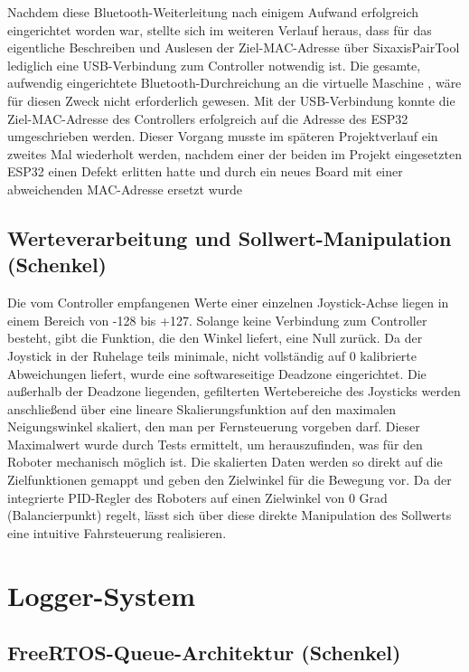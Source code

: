 \documentclass[fontsize=12pt,
parskip=half,	%
department=FakM,  %
logostyle=flat,
twoside, %
DIV=15,BCOR=10mm, %
]{OTHRreprt}
\begin{document}
Nachdem diese Bluetooth-Weiterleitung nach einigem Aufwand erfolgreich eingerichtet worden war, stellte sich im weiteren Verlauf heraus, dass für das eigentliche Beschreiben und Auslesen der Ziel-MAC-Adresse über SixaxisPairTool lediglich eine USB-Verbindung zum Controller notwendig ist.
 Die gesamte, aufwendig eingerichtete Bluetooth-Durchreichung an die virtuelle Maschine , wäre für diesen Zweck nicht erforderlich gewesen. 
 Mit der USB-Verbindung konnte die Ziel-MAC-Adresse des Controllers erfolgreich auf die Adresse des ESP32 umgeschrieben werden. 
 Dieser Vorgang musste im späteren Projektverlauf ein zweites Mal wiederholt werden, nachdem einer der beiden im Projekt eingesetzten ESP32 einen Defekt erlitten hatte und durch ein neues Board mit einer abweichenden MAC-Adresse ersetzt wurde

\subsection{Werteverarbeitung und Sollwert-Manipulation (Schenkel)}
\label{subsec:ps4_werteverarbeitung}

Die vom Controller empfangenen Werte einer einzelnen Joystick-Achse liegen in einem Bereich von -128 bis +127. 
Solange keine Verbindung zum Controller besteht, gibt die Funktion, die den Winkel liefert, eine Null zurück. 
Da der Joystick in der Ruhelage teils minimale, nicht vollständig auf 0 kalibrierte Abweichungen liefert, wurde eine softwareseitige Deadzone eingerichtet.
Die außerhalb der Deadzone liegenden, gefilterten Wertebereiche des Joysticks werden anschließend über eine lineare Skalierungsfunktion auf den maximalen Neigungswinkel skaliert, den man per Fernsteuerung vorgeben darf. 
Dieser Maximalwert wurde durch Tests ermittelt, um herauszufinden, was für den Roboter mechanisch möglich ist. Die skalierten Daten werden so direkt auf die Zielfunktionen gemappt und geben den Zielwinkel für die Bewegung vor. 
Da der integrierte PID-Regler des Roboters auf einen Zielwinkel von 0 Grad (Balancierpunkt) regelt, lässt sich über diese direkte Manipulation des Sollwerts eine intuitive Fahrsteuerung realisieren.


\section{Logger-System }
\label{sec:logger_system}

\subsection{FreeRTOS-Queue-Architektur (Schenkel)}
\label{subsec:logger_queue}
\end{document}
